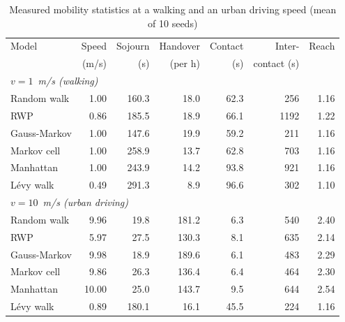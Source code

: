 \begin{table}[t]
\centering
\caption{Measured mobility statistics at a walking and an urban driving speed (mean of 10 seeds)}
\label{tab:stats}
\footnotesize
\renewcommand{\arraystretch}{1.1}
\setlength{\tabcolsep}{2.2pt}
\begin{tabular}{lrrrrrr}
\hline
Model & Speed & Sojourn & Handover & Contact & Inter- & Reach \\
 & (m/s) & (s) & (per h) & (s) & contact (s) & \\
\hline
\multicolumn{7}{l}{\emph{$v=1$~m/s (walking)}} \\
Random walk & 1.00 & 160.3 & 18.0 & 62.3 & 256 & 1.16 \\
RWP & 0.86 & 185.5 & 18.9 & 66.1 & 1192 & 1.22 \\
Gauss-Markov & 1.00 & 147.6 & 19.9 & 59.2 & 211 & 1.16 \\
Markov cell & 1.00 & 258.9 & 13.7 & 62.8 & 703 & 1.16 \\
Manhattan & 1.00 & 243.9 & 14.2 & 93.8 & 921 & 1.16 \\
L\'evy walk & 0.49 & 291.3 & 8.9 & 96.6 & 302 & 1.10 \\
\multicolumn{7}{l}{\emph{$v=10$~m/s (urban driving)}} \\
Random walk & 9.96 & 19.8 & 181.2 & 6.3 & 540 & 2.40 \\
RWP & 5.97 & 27.5 & 130.3 & 8.1 & 635 & 2.14 \\
Gauss-Markov & 9.98 & 18.9 & 189.6 & 6.1 & 483 & 2.29 \\
Markov cell & 9.86 & 26.3 & 136.4 & 6.4 & 464 & 2.30 \\
Manhattan & 10.00 & 25.0 & 143.7 & 9.5 & 644 & 2.54 \\
L\'evy walk & 0.89 & 180.1 & 16.1 & 45.5 & 224 & 1.16 \\
\hline
\end{tabular}
\end{table}

